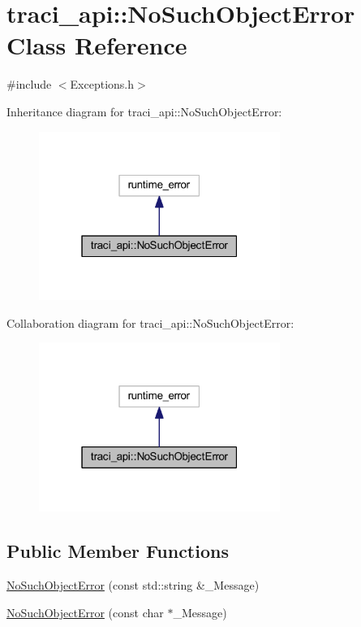 \hypertarget{classtraci__api_1_1_no_such_object_error}{}\section{traci\+\_\+api\+:\+:No\+Such\+Object\+Error Class Reference}
\label{classtraci__api_1_1_no_such_object_error}


{\ttfamily \#include $<$Exceptions.\+h$>$}



Inheritance diagram for traci\+\_\+api\+:\+:No\+Such\+Object\+Error\+:
\nopagebreak
\begin{figure}[H]
\begin{center}
\leavevmode
\includegraphics[width=223pt]{classtraci__api_1_1_no_such_object_error__inherit__graph}
\end{center}
\end{figure}


Collaboration diagram for traci\+\_\+api\+:\+:No\+Such\+Object\+Error\+:
\nopagebreak
\begin{figure}[H]
\begin{center}
\leavevmode
\includegraphics[width=223pt]{classtraci__api_1_1_no_such_object_error__coll__graph}
\end{center}
\end{figure}
\subsection*{Public Member Functions}
\begin{DoxyCompactItemize}
\item 
\hyperlink{classtraci__api_1_1_no_such_object_error_aebe9140c2931a0e35c5b51bbc9c511ef}{No\+Such\+Object\+Error} (const std\+::string \&\+\_\+\+Message)
\item 
\hyperlink{classtraci__api_1_1_no_such_object_error_af616a893c0094adf1d46bd3fa0664c62}{No\+Such\+Object\+Error} (const char $\ast$\+\_\+\+Message)
\end{DoxyCompactItemize}



